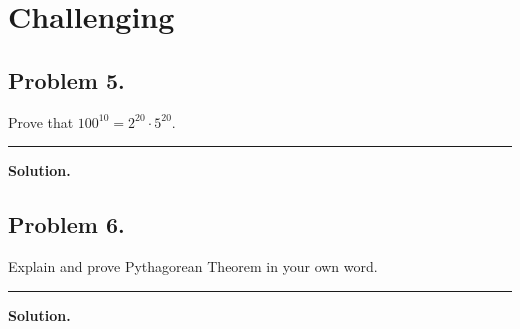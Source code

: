 \documentclass{article}
\newcommand {\MyLine} {
    \smallskip \noindent\rule{\textwidth}{0.4pt} \smallskip
}
\begin{document}
\section*{\textcolor{BrickRed}{Challenging}}
\begin{minipage}[t][0.45\textheight][t]{\textwidth}
\subsection*{Problem 5.} %
{\color {Gray}
Prove that $100^{10} = 2^{20} \cdot 5^{20}$.
}

\MyLine

\textbf{Solution.}

\end{minipage}

\begin{minipage}[t][0.45\textheight][t]{\textwidth}
\subsection*{Problem 6.} %
{\color {Gray}
Explain and prove Pythagorean Theorem in your own word.
}

\MyLine

\textbf{Solution.}

\end{minipage}
\end{document}
